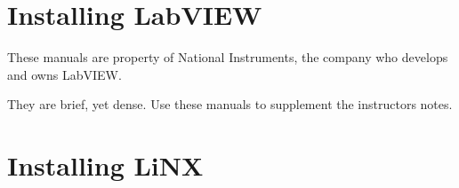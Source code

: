 \appendix
\chapter{Installing LabVIEW}
These manuals are property of National Instruments, the company who develops and owns LabVIEW.


They are brief, yet dense. Use these manuals to supplement the instructors notes.
\chapter{Installing LiNX}